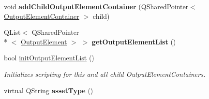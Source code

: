\begin{DoxyCompactItemize}
\item 
\hypertarget{class_picto_1_1_output_element_container_a052232ddc52da2b1dc1d8354cbc2bfeb}{void {\bfseries add\-Child\-Output\-Element\-Container} (Q\-Shared\-Pointer$<$ \hyperlink{class_picto_1_1_output_element_container}{Output\-Element\-Container} $>$ child)}\label{class_picto_1_1_output_element_container_a052232ddc52da2b1dc1d8354cbc2bfeb}

\item 
\hypertarget{class_picto_1_1_output_element_container_a9035b48d3a5ec06e4f0accc946c57522}{Q\-List$<$ Q\-Shared\-Pointer\\*
$<$ \hyperlink{class_picto_1_1_output_element}{Output\-Element} $>$ $>$ {\bfseries get\-Output\-Element\-List} ()}\label{class_picto_1_1_output_element_container_a9035b48d3a5ec06e4f0accc946c57522}

\item 
bool \hyperlink{class_picto_1_1_output_element_container_a81567510167f97bacac19cca8db7b99d}{init\-Output\-Element\-List} ()
\begin{DoxyCompactList}\small\item\em Initializes scripting for this and all child Output\-Element\-Containers. \end{DoxyCompactList}\item 
\hypertarget{class_picto_1_1_output_element_container_a69bc07caf15d7835273e19f0ef6a9bbc}{virtual Q\-String {\bfseries asset\-Type} ()}\label{class_picto_1_1_output_element_container_a69bc07caf15d7835273e19f0ef6a9bbc}

\end{DoxyCompactItemize}

